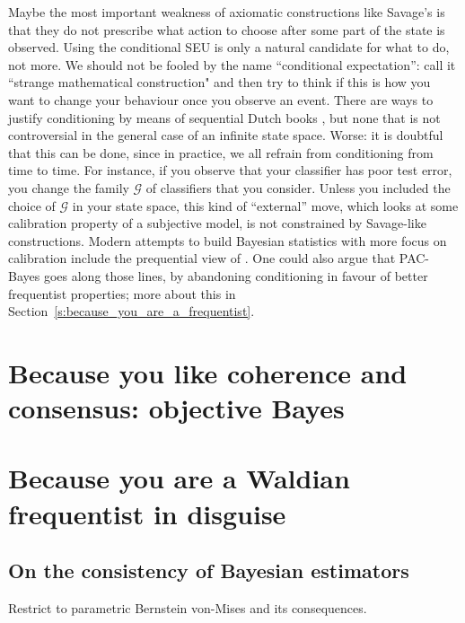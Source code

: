 Maybe the most important weakness of axiomatic constructions like Savage's is that they do not prescribe what action to choose after some part of the state is observed. 
Using the conditional SEU is only a natural candidate for what to do, not more.
We should not be fooled by the name ``conditional expectation'': call it ``strange mathematical construction" and then try to think if this is how you want to change your behaviour once you observe an event.
There are ways to justify conditioning by means of sequential Dutch books \citep{}, but none that is not controversial in the general case of an infinite state space.
Worse: it is doubtful that this can be done, since in practice, we all refrain from conditioning from time to time. 
For instance, if you observe that your classifier has poor test error, you change the family $\mathcal{G}$ of classifiers that you consider.
Unless you included the choice of $\mathcal{G}$ in your state space, this kind of ``external'' move, which looks at some calibration property of a subjective model, is not constrained by Savage-like constructions. 
Modern attempts to build Bayesian statistics with more focus on calibration include the prequential view of \cite{Daw}.
One could also argue that PAC-Bayes goes along those lines, by abandoning conditioning in favour of better frequentist properties; more about this in Section~\ref{s:because_you_are_a_frequentist}.


\section{Because you like coherence and consensus: objective Bayes}

\section{Because you are a Waldian frequentist in disguise}
\label{e:because_you_are_a_frequentist}

\subsection{On the consistency of Bayesian estimators}
Restrict to parametric Bernstein von-Mises and its consequences.

